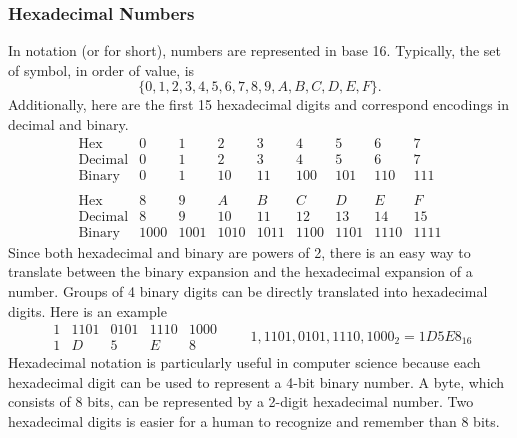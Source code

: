 \subsubsection*{Hexadecimal Numbers}
In  notation (or  for short), numbers are represented in base 16. Typically, the set of symbol, in order of value, is
\[
  \{0,1,2,3,4,5,6,7,8,9,A,B,C,D,E,F\}.
\]
Additionally, here are the first 15 hexadecimal digits and correspond encodings in decimal and binary.
\[
  \begin{array}{lccccccccc}
    \text{Hex}     & 0    & 1    & 2    & 3    & 4    & 5    & 6    & 7    \\
    \text{Decimal} & 0    & 1    & 2    & 3    & 4    & 5    & 6    & 7    \\
    \text{Binary}  & 0    & 1    & 10   & 11   & 100  & 101  & 110  & 111  \\ \\
    \text{Hex}     & 8    & 9    & A    & B    & C    & D    & E    & F    \\
    \text{Decimal} & 8    & 9    & 10   & 11   & 12   & 13   & 14   & 15   \\
    \text{Binary}  & 1000 & 1001 & 1010 & 1011 & 1100 & 1101 & 1110 & 1111
  \end{array}
\]
Since both hexadecimal and binary are powers of 2, there is an easy way to translate between the binary expansion and the hexadecimal expansion of a number. Groups of 4 binary digits can be directly translated into hexadecimal digits. Here is an example
\[
  \begin{array}{ccccc}
    1 & 1101 & 0101 & 1110 & 1000 \\
    1 & D    & 5    & E    & 8
  \end{array} \qquad 1,1101,0101,1110,1000_2 = 1D5E8_{16}
\]
Hexadecimal notation is particularly useful in computer science because each hexadecimal digit can be used to represent a 4-bit binary number. A byte, which consists of 8 bits, can be represented by a 2-digit hexadecimal number. Two hexadecimal digits is easier for a human to recognize and remember than 8 bits.

